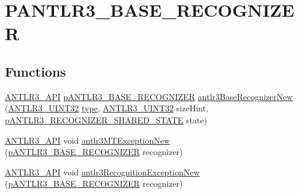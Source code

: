 \hypertarget{group__p_a_n_t_l_r3___b_a_s_e___r_e_c_o_g_n_i_z_e_r}{\section{P\-A\-N\-T\-L\-R3\-\_\-\-B\-A\-S\-E\-\_\-\-R\-E\-C\-O\-G\-N\-I\-Z\-E\-R}
\label{group__p_a_n_t_l_r3___b_a_s_e___r_e_c_o_g_n_i_z_e_r}
}
\subsection*{Functions}
\begin{DoxyCompactItemize}
\item 
\hyperlink{antlr3defs_8h_ac6724ab3b71a7f4b3c340f52312e8488}{A\-N\-T\-L\-R3\-\_\-\-A\-P\-I} \hyperlink{group___a_n_t_l_r3___b_a_s_e___r_e_c_o_g_n_i_z_e_r_ga5aeeb8dcbf65f45605ae07cbd618e24c}{p\-A\-N\-T\-L\-R3\-\_\-\-B\-A\-S\-E\-\_\-\-R\-E\-C\-O\-G\-N\-I\-Z\-E\-R} \hyperlink{group__p_a_n_t_l_r3___b_a_s_e___r_e_c_o_g_n_i_z_e_r_ga5b539798327f965e6289a9f613515c9a}{antlr3\-Base\-Recognizer\-New} (\hyperlink{antlr3defs_8h_ac41f744abd0fd25144b9eb9d11b1dfd1}{A\-N\-T\-L\-R3\-\_\-\-U\-I\-N\-T32} \hyperlink{convert2cfg_8m_a2902a7a983ab04c79cae2162ad553481}{type}, \hyperlink{antlr3defs_8h_ac41f744abd0fd25144b9eb9d11b1dfd1}{A\-N\-T\-L\-R3\-\_\-\-U\-I\-N\-T32} size\-Hint, \hyperlink{antlr3interfaces_8h_a180526531b2c6da5cafe825ae7596bf1}{p\-A\-N\-T\-L\-R3\-\_\-\-R\-E\-C\-O\-G\-N\-I\-Z\-E\-R\-\_\-\-S\-H\-A\-R\-E\-D\-\_\-\-S\-T\-A\-T\-E} state)
\item 
\hyperlink{antlr3defs_8h_ac6724ab3b71a7f4b3c340f52312e8488}{A\-N\-T\-L\-R3\-\_\-\-A\-P\-I} void \hyperlink{group__p_a_n_t_l_r3___b_a_s_e___r_e_c_o_g_n_i_z_e_r_ga974d33def91ba5fb5a6fa8e42c6d876e}{antlr3\-M\-T\-Exception\-New} (\hyperlink{group___a_n_t_l_r3___b_a_s_e___r_e_c_o_g_n_i_z_e_r_ga5aeeb8dcbf65f45605ae07cbd618e24c}{p\-A\-N\-T\-L\-R3\-\_\-\-B\-A\-S\-E\-\_\-\-R\-E\-C\-O\-G\-N\-I\-Z\-E\-R} recognizer)
\item 
\hyperlink{antlr3defs_8h_ac6724ab3b71a7f4b3c340f52312e8488}{A\-N\-T\-L\-R3\-\_\-\-A\-P\-I} void \hyperlink{group__p_a_n_t_l_r3___b_a_s_e___r_e_c_o_g_n_i_z_e_r_gab2d77cd376112c8ff6ed7353ba78dab7}{antlr3\-Recognition\-Exception\-New} (\hyperlink{group___a_n_t_l_r3___b_a_s_e___r_e_c_o_g_n_i_z_e_r_ga5aeeb8dcbf65f45605ae07cbd618e24c}{p\-A\-N\-T\-L\-R3\-\_\-\-B\-A\-S\-E\-\_\-\-R\-E\-C\-O\-G\-N\-I\-Z\-E\-R} recognizer)
\end{DoxyCompactItemize}


